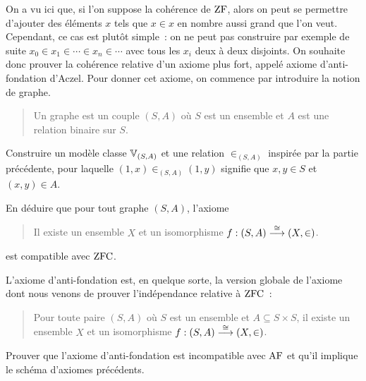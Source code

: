 \begin{problem}
  On a vu ici que, si l'on suppose la cohérence de $\operatorname{ZF}$, alors on peut se
  permettre d'ajouter des éléments $x$ tels que $x \in x$ en nombre aussi grand
  que l'on veut. Cependant, ce cas est plutôt simple~: on ne peut pas construire
  par exemple de suite $x_0 \in x_1 \in \cdots \in x_n \in \cdots$ avec tous les
  $x_i$ deux à deux disjoints. On souhaite donc prouver la cohérence relative
  d'un axiome plus fort, appelé axiome d'anti-fondation d'Aczel. Pour donner cet
  axiome, on commence par introduire la notion de graphe.
  \begin{quotation}
    \noindent
    Un graphe est un couple $(S,A)$ où $S$ est un ensemble et $A$ est une
    relation binaire sur $S$.
  \end{quotation}
  \begin{pbQuest}
  \item Construire un modèle classe $\mathbb V_{(S,A)}$ et une relation $\in_{(S,A)}$
    inspirée par la partie précédente, pour laquelle $(1,x)\in_{(S,A)} (1,y)$
    signifie que $x,y \in S$ et $(x,y) \in A$.
  \item En déduire que pour tout graphe $(S,A)$, l'axiome
    \begin{quotation}
      \noindent
      Il existe un ensemble $X$ et un isomorphisme
      $f : \displaystyle (S,A) \overset{\cong}{\longrightarrow} (X,\in)$.
    \end{quotation}
    est compatible avec $\operatorname{ZFC}$.
  \end{pbQuest}

  L'axiome d'anti-fondation est, en quelque sorte, la version globale de
  l'axiome dont nous venons de prouver l'indépendance relative à $\operatorname{ZFC}$~:
  \begin{quotation}
    \noindent
    Pour toute paire $(S,A)$ où $S$ est un ensemble et $A\subseteq S \times S$,
    il existe un ensemble $X$ et un isomorphisme
    $f : \displaystyle (S,A) \overset{\cong}{\longrightarrow} (X,\in)$.
  \end{quotation}

  \begin{pbQuest}[resume]
  \item Prouver que l'axiome d'anti-fondation est incompatible avec $\operatorname{AF}$ et
    qu'il implique le schéma d'axiomes précédents.
  \end{pbQuest}


\end{problem}

